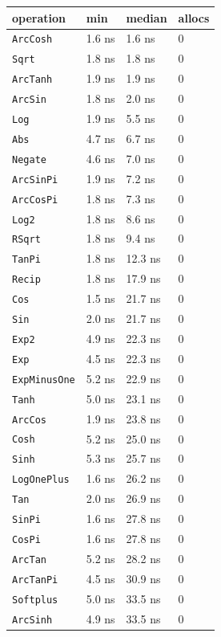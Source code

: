 \begin{table}[h]
\centering
\nopagebreak[3]
\begin{tabulary}{\linewidth}{L L L L}
\toprule
operation & min & median & allocs \\
\toprule
\texttt{ArcCosh} & 1.6 ns & 1.6 ns & 0 \\
\texttt{Sqrt} & 1.8 ns & 1.8 ns & 0 \\
\texttt{ArcTanh} & 1.9 ns & 1.9 ns & 0 \\
\texttt{ArcSin} & 1.8 ns & 2.0 ns & 0 \\
\texttt{Log} & 1.9 ns & 5.5 ns & 0 \\
\texttt{Abs} & 4.7 ns & 6.7 ns & 0 \\
\texttt{Negate} & 4.6 ns & 7.0 ns & 0 \\
\texttt{ArcSinPi} & 1.9 ns & 7.2 ns & 0 \\
\texttt{ArcCosPi} & 1.8 ns & 7.3 ns & 0 \\
\texttt{Log2} & 1.8 ns & 8.6 ns & 0 \\
\texttt{RSqrt} & 1.8 ns & 9.4 ns & 0 \\
\texttt{TanPi} & 1.8 ns & 12.3 ns & 0 \\
\texttt{Recip} & 1.8 ns & 17.9 ns & 0 \\
\texttt{Cos} & 1.5 ns & 21.7 ns & 0 \\
\texttt{Sin} & 2.0 ns & 21.7 ns & 0 \\
\texttt{Exp2} & 4.9 ns & 22.3 ns & 0 \\
\texttt{Exp} & 4.5 ns & 22.3 ns & 0 \\
\texttt{ExpMinusOne} & 5.2 ns & 22.9 ns & 0 \\
\texttt{Tanh} & 5.0 ns & 23.1 ns & 0 \\
\texttt{ArcCos} & 1.9 ns & 23.8 ns & 0 \\
\texttt{Cosh} & 5.2 ns & 25.0 ns & 0 \\
\texttt{Sinh} & 5.3 ns & 25.7 ns & 0 \\
\texttt{LogOnePlus} & 1.6 ns & 26.2 ns & 0 \\
\texttt{Tan} & 2.0 ns & 26.9 ns & 0 \\
\texttt{SinPi} & 1.6 ns & 27.8 ns & 0 \\
\texttt{CosPi} & 1.6 ns & 27.8 ns & 0 \\
\texttt{ArcTan} & 5.2 ns & 28.2 ns & 0 \\
\texttt{ArcTanPi} & 4.5 ns & 30.9 ns & 0 \\
\texttt{Softplus} & 5.0 ns & 33.5 ns & 0 \\
\texttt{ArcSinh} & 4.9 ns & 33.5 ns & 0 \\
\bottomrule
\end{tabulary}

\end{table}




